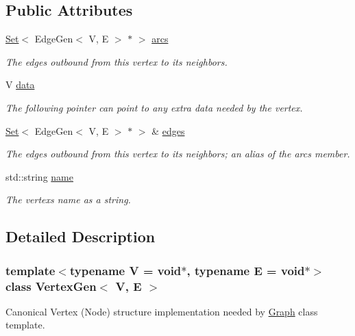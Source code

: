 \subsection*{Public Attributes}
\begin{DoxyCompactItemize}
\item 
\mbox{\hyperlink{classSet}{Set}}$<$ Edge\+Gen$<$ V, E $>$ $\ast$ $>$ \mbox{\hyperlink{classVertexGen_aa0cee1fcace4fca3db468e83aa4672fe}{arcs}}
\begin{DoxyCompactList}\small\item\em The edges outbound from this vertex to its neighbors. \end{DoxyCompactList}\item 
V \mbox{\hyperlink{classVertexGen_a0cff2e152738a487e0930e21b7824c40}{data}}
\begin{DoxyCompactList}\small\item\em The following pointer can point to any extra data needed by the vertex. \end{DoxyCompactList}\item 
\mbox{\hyperlink{classSet}{Set}}$<$ Edge\+Gen$<$ V, E $>$ $\ast$ $>$ \& \mbox{\hyperlink{classVertexGen_a795e7fd80b24c26fdd9fa879db40a403}{edges}}
\begin{DoxyCompactList}\small\item\em The edges outbound from this vertex to its neighbors; an alias of the \textquotesingle{}arcs\textquotesingle{} member. \end{DoxyCompactList}\item 
std\+::string \mbox{\hyperlink{classVertexGen_a9b45b3e13bd9167aab02e17e08916231}{name}}
\begin{DoxyCompactList}\small\item\em The vertex\textquotesingle{}s name as a string. \end{DoxyCompactList}\end{DoxyCompactItemize}


\subsection{Detailed Description}
\subsubsection*{template$<$typename V = void$\ast$, typename E = void$\ast$$>$\newline
class Vertex\+Gen$<$ V, E $>$}

Canonical Vertex (Node) structure implementation needed by \mbox{\hyperlink{classGraph}{Graph}} class template. 

